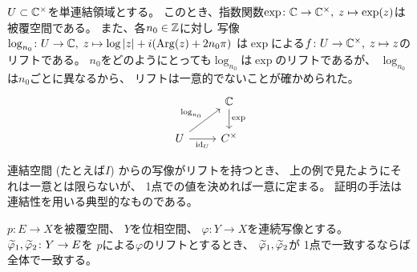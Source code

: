 \documentclass[report]{jlreq}
\begin{document}
\begin{example}[リフトが一意でない例]
    $U \subset \mathbb{C}^\times$を単連結領域とする。
    このとき、指数関数$\exp \colon \mathbb{C} \to \mathbb{C}^\times,\;
    z \mapsto \exp(z)$は被覆空間である。
    また、各$n_0 \in \mathbb{Z}$に対し
    写像$\log_{n_0} \colon U \to \mathbb{C},\;
    z \mapsto \log |z| + i (\mathrm{Arg} (z) + 2n_0\pi)$
    は$\exp$による$f \colon U \to \mathbb{C}^\times,\; z \mapsto z$のリフトである。
    $n_0$をどのようにとっても$\log_{n_0}$は$\exp$のリフトであるが、
    $\log_{n_0}$は$n_0$ごとに異なるから、
    リフトは一意的でないことが確かめられた。
    \begin{equation}
        \begin{tikzcd}
            & \C \ar{d}{\exp} \\
            U \ar{ur}{\log_{n_0}} \ar{r}[swap]{\id_{U}} & C^\times
        \end{tikzcd}
    \end{equation}
\end{example}

連結空間 (たとえば$I$) からの写像がリフトを持つとき、
上の例で見たようにそれは一意とは限らないが、
1点での値を決めれば一意に定まる。
証明の手法は連結性を用いる典型的なものである。

\begin{theorem}[リフトの一意性定理]
    $p \colon E \to X$を被覆空間、
    $Y$を位相空間、
    $\varphi \colon Y \to X$を連続写像とする。
    $\widetilde{\varphi}_1, \widetilde{\varphi}_2 \colon Y \to E$を
    $p$による$\varphi$のリフトとするとき、
    $\widetilde{\varphi}_1, \widetilde{\varphi}_2$が
    1点で一致するならば全体で一致する。
\end{theorem}
\end{document}
